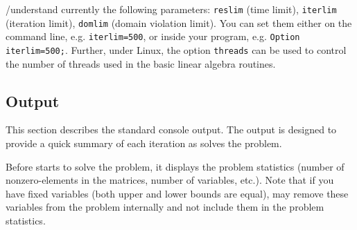
\GAMS/\IPOPT understand currently the following \GAMS parameters: \texttt{reslim} (time limit), \texttt{iterlim} (iteration limit), \texttt{domlim} (domain violation limit).
You can set them either on the command line, e.g. \verb+iterlim=500+, or inside your \GAMS program, e.g. \verb+Option iterlim=500;+.
Further, under Linux, the option \texttt{threads} can be used to control the number of threads used in the basic linear algebra routines.


\subsection{Output}

This section describes the standard \IPOPT console output.
The output is designed to provide a quick summary of each iteration as \IPOPT solves the problem.

Before \IPOPT starts to solve the problem, it displays the problem statistics (number of nonzero-elements in the matrices, number of variables, etc.).
Note that if you have fixed variables (both upper and lower bounds are equal), \IPOPT may remove these variables from the problem internally and not include them in the problem statistics.

